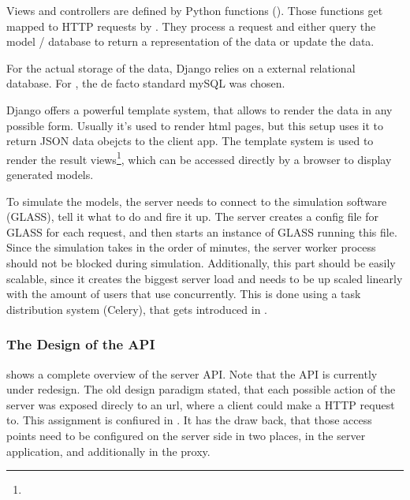 Views and controllers are defined by Python functions ().
Those functions get mapped to HTTP requests by .
They process a request and either query the model / database to return a representation of the data or update the data.

For the actual storage of the data, Django relies on a external relational database.
For \spl, the de facto standard mySQL was chosen.

Django offers a powerful template system, that allows to render the data in any possible form.
Usually it's used to render html pages, but this setup uses it to return JSON data obejcts to the client app.
The template system is used to render the result views\footnote{}, which can be accessed directly by a browser to display generated models.

To simulate the models, the server needs to connect to the simulation software (GLASS), tell it what to do and fire it up.
The server creates a config file for GLASS for each request, and then starts an instance of GLASS running this file.
Since the simulation takes in the order of minutes, the server worker process should not be blocked during simulation.
Additionally, this part should be easily scalable, since it creates the biggest server load and needs to be up scaled linearly with the amount of users that use \spl concurrently.
This is done using a task distribution system (Celery), that gets introduced in .







\subsubsection{The Design of the API}





 shows a complete overview of the server API.
Note that the API is currently under redesign.
The old design paradigm stated, that each possible action of the server was exposed direcly to an url, where a client could make a HTTP request to. This assignment is confiured in .
It has the draw back, that those access points need to be configured on the server side in two places, in the server application, and additionally in the proxy.

